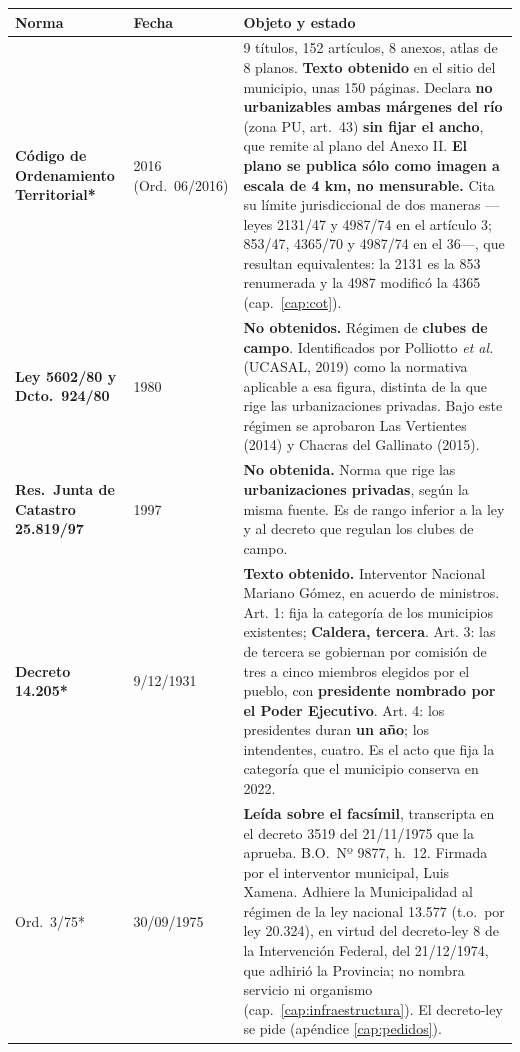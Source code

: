 \begin{longtable}{@{}p{2.6cm}p{2.2cm}p{8.2cm}@{}}
\toprule
\textbf{Norma} & \textbf{Fecha} & \textbf{Objeto y estado} \\
\midrule
\endhead
\textbf{Código de Ordenamiento Territorial*} & 2016 (Ord.\ 06/2016) & 9 títulos, 152 artículos, 8 anexos, atlas de 8 planos. \textbf{Texto obtenido} en el sitio del municipio, unas 150 páginas. Declara \textbf{no urbanizables ambas márgenes del río} (zona PU, art.\ 43) \textbf{sin fijar el ancho}, que remite al plano del Anexo II. \textbf{El plano se publica sólo como imagen a escala de 4 km, no mensurable.} Cita su límite jurisdiccional de dos maneras ---leyes 2131/47 y 4987/74 en el artículo 3; 853/47, 4365/70 y 4987/74 en el 36---, que resultan equivalentes: la 2131 es la 853 renumerada y la 4987 modificó la 4365 (cap.~\ref{cap:cot}). \\
\textbf{Ley 5602/80 y Dcto.\ 924/80} & 1980 & \textbf{No obtenidos.} Régimen de \textbf{clubes de campo}. Identificados por Polliotto \textit{et al.} (UCASAL, 2019) como la normativa aplicable a esa figura, distinta de la que rige las urbanizaciones privadas. Bajo este régimen se aprobaron Las Vertientes (2014) y Chacras del Gallinato (2015). \\
\textbf{Res.\ Junta de Catastro 25.819/97} & 1997 & \textbf{No obtenida.} Norma que rige las \textbf{urbanizaciones privadas}, según la misma fuente. Es de rango inferior a la ley y al decreto que regulan los clubes de campo. \\
\textbf{Decreto 14.205*} & 9/12/1931 & \textbf{Texto obtenido.} Interventor Nacional Mariano Gómez, en acuerdo de ministros. Art. 1: fija la categoría de los municipios existentes; \textbf{Caldera, tercera}. Art. 3: las de tercera se gobiernan por comisión de tres a cinco miembros elegidos por el pueblo, con \textbf{presidente nombrado por el Poder Ejecutivo}. Art. 4: los presidentes duran \textbf{un año}; los intendentes, cuatro. Es el acto que fija la categoría que el municipio conserva en 2022. \\
Ord.\ 3/75* & 30/09/1975 & \textbf{Leída sobre el facsímil}, transcripta en el decreto 3519 del 21/11/1975 que la aprueba. B.O.\ Nº 9877, h.\ 12. Firmada por el interventor municipal, Luis Xamena. Adhiere la Municipalidad al régimen de la ley nacional 13.577 (t.o.\ por ley 20.324), en virtud del decreto-ley 8 de la Intervención Federal, del 21/12/1974, que adhirió la Provincia; no nombra servicio ni organismo (cap.\ \ref{cap:infraestructura}). El decreto-ley se pide (apéndice \ref{cap:pedidos}). \\

\end{longtable}
